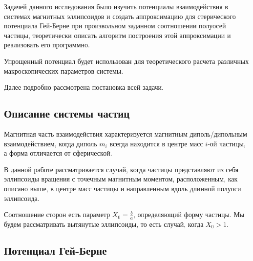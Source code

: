 \documentclass[a4paper,14pt]{extarticle}
\begin{document}
    Задачей данного исследования было изучить потенциалы
    взаимодействия в системах магнитных эллипсоидов и
    создать аппроксимацию для стерического потенциала
    Гей-Берне при произвольном заданном соотношении
    полуосей частицы, теоретически описать алгоритм
    построения этой аппроксимации и реализовать его
    программно.

    Упрощенный потенциал будет использован для
    теоретического расчета различных макроскопических
    параметров системы.

    Далее подробно рассмотрена постановка всей задачи.

    \subsection{Описание системы частиц}

    Магнитная часть взаимодействия характеризуется магнитным диполь\-/дипольным взаимодействием, когда диполь $m_i$ всегда находится в центре масс $i$-ой частицы, а форма отличается от сферической.

    В данной работе рассматривается случай, когда частицы представляют из себя эллипсоиды вращения с точечным магнитным моментом, расположенным, как описано выше, в центре масс частицы и направленным вдоль длинной полуоси эллипсоида.

    Соотношение сторон есть параметр $X_0 = \frac{b}{a}$, определяющий форму частицы. Мы будем рассматривать вытянутые эллипсоиды, то есть случай, когда $X_0 > 1$.

    \subsection{Потенциал Гей-Берне}
\end{document}
